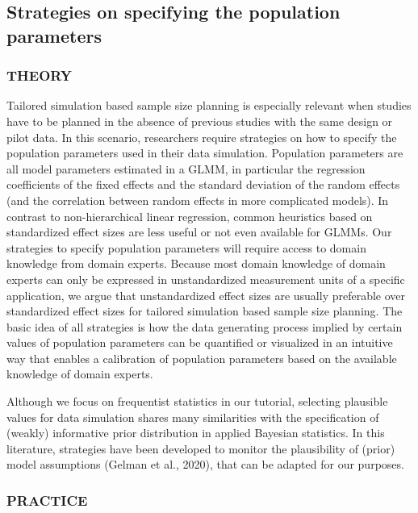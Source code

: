 \documentclass[
  man,floatsintext]{apa6}
\begin{document}
\hypertarget{strategies-on-specifying-the-population-parameters}{%
\subsection{Strategies on specifying the population parameters}\label{strategies-on-specifying-the-population-parameters}}

\hypertarget{theory-2}{%
\subsubsection{THEORY}\label{theory-2}}

Tailored simulation based sample size planning is especially relevant when studies have to be planned in the absence of previous studies with the same design or pilot data.
In this scenario, researchers require strategies on how to specify the population parameters used in their data simulation.
Population parameters are all model parameters estimated in a GLMM, in particular the regression coefficients of the fixed effects and the standard deviation of the random effects (and the correlation between random effects in more complicated models).
In contrast to non-hierarchical linear regression, common heuristics based on standardized effect sizes are less useful or not even available for GLMMs.
Our strategies to specify population parameters will require access to domain knowledge from domain experts.
Because most domain knowledge of domain experts can only be expressed in unstandardized measurement units of a specific application, we argue that unstandardized effect sizes are usually preferable over standardized effect sizes for tailored simulation based sample size planning.
The basic idea of all strategies is how the data generating process implied by certain values of population parameters can be quantified or visualized in an intuitive way that enables a calibration of population parameters based on the available knowledge of domain experts.

Although we focus on frequentist statistics in our tutorial, selecting plausible values for data simulation shares many similarities with the specification of (weakly) informative prior distribution in applied Bayesian statistics.
In this literature, strategies have been developed to monitor the plausibility of (prior) model assumptions (Gelman et al., 2020), that can be adapted for our purposes.

\hypertarget{practice-2}{%
\subsubsection{PRACTICE}\label{practice-2}}
\end{document}
